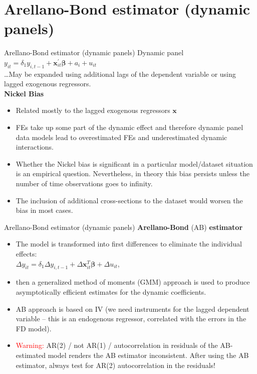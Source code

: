 \documentclass[usenames,dvipsnames]{beamer}
\begin{document}
\section{Arellano-Bond estimator (dynamic panels)}
\begin{frame}{Arellano-Bond estimator (dynamic panels)}
Dynamic panel\\
\medskip
$y_{it} = \delta_1 y_{i,t-1} + \bm{x}^{\prime}_{it} \bm{\beta} + a_i + u_{it}$\\
\medskip
\dots May be expanded using additional lags of the dependent variable or using lagged exogenous regressors.\\
\medskip
\small
\textbf{Nickel Bias}
\begin{itemize}
\item Related mostly to the lagged exogenous regressors $\bm{x}$
\item FEs take up some part of the dynamic effect and therefore dynamic panel data models lead to overestimated FEs and underestimated dynamic interactions. 
\item Whether the Nickel bias is significant in a particular model/dataset situation is an empirical question. Nevertheless, in theory this bias persists unless the number of time observations goes to infinity.
\item The inclusion of additional cross-sections to the dataset would worsen the bias in most cases.
\end{itemize}
\end{frame}
\begin{frame}{Arellano-Bond estimator (dynamic panels)}
\textbf{Arellano-Bond} (AB) \textbf{estimator} 
\begin{itemize}
\item The model is transformed into first differences to eliminate the individual effects:\\
$\Delta y_{it} = \delta_1 \Delta y_{i,t-1} + \Delta \bm{x}^T_{it} \bm{\beta} + \Delta u_{it}$, 
\item then a generalized method of moments (GMM) approach is used to produce asymptotically efficient estimates for the dynamic coefficients.
\item AB approach is based on IV (we need instruments for the lagged dependent variable – this is an endogenous regressor, correlated with the errors in the FD model).
\item \textcolor{Red}{Warning:} AR(2) / not AR(1) / autocorrelation in residuals of the AB-estimated model renders the AB estimator inconsistent. After using the AB estimator, always test for AR(2) autocorrelation in the residuals!
\end{itemize}
\end{frame}
\end{document}
